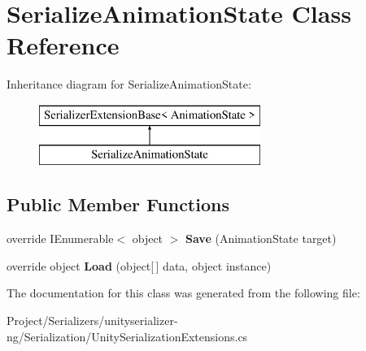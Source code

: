\hypertarget{class_serialize_animation_state}{}\section{Serialize\+Animation\+State Class Reference}
\label{class_serialize_animation_state}
Inheritance diagram for Serialize\+Animation\+State\+:\begin{figure}[H]
\begin{center}
\leavevmode
\includegraphics[height=2.000000cm]{class_serialize_animation_state}
\end{center}
\end{figure}
\subsection*{Public Member Functions}
\begin{DoxyCompactItemize}
\item 
\mbox{\label{class_serialize_animation_state_a3c4bec56bc5d5363ebdcc7a85e361bca}} 
override I\+Enumerable$<$ object $>$ {\bfseries Save} (Animation\+State target)
\item 
\mbox{\label{class_serialize_animation_state_a2e05ae356542c8df18779774e5189cee}} 
override object {\bfseries Load} (object\mbox{[}$\,$\mbox{]} data, object instance)
\end{DoxyCompactItemize}


The documentation for this class was generated from the following file\+:\begin{DoxyCompactItemize}
\item 
Project/\+Serializers/unityserializer-\/ng/\+Serialization/Unity\+Serialization\+Extensions.\+cs\end{DoxyCompactItemize}
